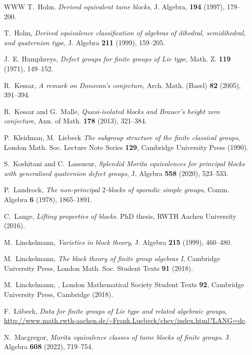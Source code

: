 \documentclass{amsart}
\theoremstyle{plain}\newtheorem{Theorem}{Theorem}[section]
\theoremstyle{plain}\newtheorem{Conjecture}[Theorem]{Conjecture}
\theoremstyle{plain}\newtheorem{Corollary}[Theorem]{Corollary}
\theoremstyle{plain}\newtheorem{Lemma}[Theorem]{Lemma}
\theoremstyle{plain}\newtheorem{Proposition}[Theorem]{Proposition}
\theoremstyle{definition}\newtheorem{Definition}[Theorem]{Definition}
\theoremstyle{definition}\newtheorem{Example}[Theorem]{Example}
\theoremstyle{definition}\newtheorem{Examples}[Theorem]{Examples}
\theoremstyle{definition}\newtheorem{Exercise}[Theorem]{Exercise}
\theoremstyle{definition}\newtheorem{Notation}[Theorem]{Notation}
\theoremstyle{definition}\newtheorem{Remark}[Theorem]{Remark}
\theoremstyle{definition}\newtheorem{Remarks}[Theorem]{Remarks}
\numberwithin{equation}{section}
\begin{document}
\begin{thebibliography}{WWW}
T.~Holm. {\em Derived equivalent tame blocks},
J. Algebra, {\bf 194} (1997), 178--200.

 T.~Holm,  {\em Derived equivalence classification of algebras of dihedral, 
semidihedral, and quaternion type}, J. Algebra {\bf 211} (1999), 159--205. 


J.~E. Humphreys, \emph{Defect groups for finite groups of Lie type}, Math. Z. {\bf 119} (1971), 149--152.


 R.~Kessar, \emph{A remark on Donovan's conjecture}, Arch. Math. (Basel) {\bf82} (2005), 391--394.



R.~Kessar and G.~Malle, \emph{Quasi-isolated blocks and Brauer's height zero conjecture}, Ann. of Math. {\bf 178} (2013), 321--384.


 P.~Kleidman, M.~Liebeck {\em The subgroup structure of  the finite classical groups}, London Math. Soc. Lecture Note Series {\bf129}, Cambridge University Press (1990).

 S.~Koshitani and C.~Lassueur, \emph{Splendid Morita equivalences for principal 
blocks with generalised quaternion defect groups}, J. Algebra {\bf 558} (2020), 523--533.

P.~Landrock, \emph{The non-principal $2$-blocks of sporadic simple groups}, Comm. Algebra {\bf 6} (1978), 1865--1891.

C.~Lange, {\em Lifting properties of blocks}. PhD thesis, RWTH Aachen University (2016).

 M.~Linckelmann, {\em Varieties in block theory},
J. Algebra {\bf 215} (1999), 460--480.

 M.~Linckelmann, {\em The block theory of finite group
algebras I}, Cambridge University Press, London Math. Soc. Student
Texts {\bf 91} (2018). 

M.~Linckelmann, 
, London Mathematical Society Student Texts {\bf92}, Cambridge University Press, Cambridge (2018).

 F.~L{\"u}beck, \emph{Data for finite groups of Lie type and related algebraic groups}, \url{http://www.math.rwth-aachen.de/~Frank.Luebeck/chev/index.html?LANG=de}.

 N.~Macgregor, {\em Morita equivalence classes of tame blocks of finite groups}. J. Algebra {\bf 608} (2022), 719--754.


\end{thebibliography}
\end{document}
